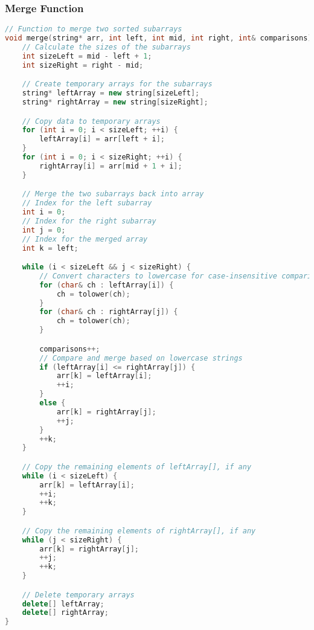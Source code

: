 \documentclass[letterpaper, 10pt,DIV=13]{scrartcl}
\numberwithin{equation}{section} %
\numberwithin{figure}{section} %
\numberwithin{table}{section} %
\begin{document}
\subsubsection{Merge Function}
\begin{linenumbers}
\begin{lstlisting}[language=C++, caption={Merge Function}, label={code:example}]
// Function to merge two sorted subarrays
void merge(string* arr, int left, int mid, int right, int& comparisons) {
    // Calculate the sizes of the subarrays
    int sizeLeft = mid - left + 1;
    int sizeRight = right - mid;

    // Create temporary arrays for the subarrays
    string* leftArray = new string[sizeLeft];
    string* rightArray = new string[sizeRight];

    // Copy data to temporary arrays
    for (int i = 0; i < sizeLeft; ++i) {
        leftArray[i] = arr[left + i];
    }
    for (int i = 0; i < sizeRight; ++i) {
        rightArray[i] = arr[mid + 1 + i];
    }

    // Merge the two subarrays back into array
    // Index for the left subarray
    int i = 0; 
    // Index for the right subarray
    int j = 0; 
    // Index for the merged array
    int k = left; 

    while (i < sizeLeft && j < sizeRight) {
        // Convert characters to lowercase for case-insensitive comparison
        for (char& ch : leftArray[i]) {
            ch = tolower(ch);
        }
        for (char& ch : rightArray[j]) {
            ch = tolower(ch);
        }

        comparisons++;
        // Compare and merge based on lowercase strings
        if (leftArray[i] <= rightArray[j]) {
            arr[k] = leftArray[i];
            ++i;
        }
        else {
            arr[k] = rightArray[j];
            ++j;
        }
        ++k;
    }

    // Copy the remaining elements of leftArray[], if any
    while (i < sizeLeft) {
        arr[k] = leftArray[i];
        ++i;
        ++k;
    }

    // Copy the remaining elements of rightArray[], if any
    while (j < sizeRight) {
        arr[k] = rightArray[j];
        ++j;
        ++k;
    }

    // Delete temporary arrays
    delete[] leftArray;
    delete[] rightArray;
}
\end{lstlisting}
\end{linenumbers}
\nolinenumbers
\end{document}
